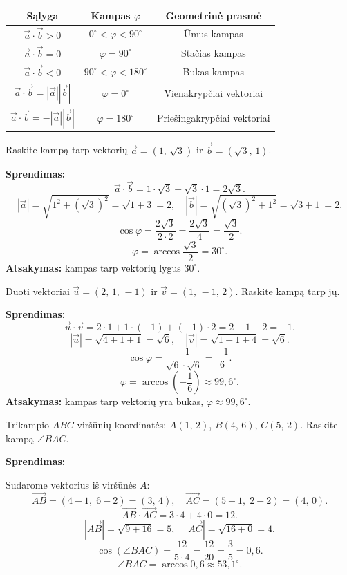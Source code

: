 \begin{center}
\begin{tabular}{|c|c|c|}
\hline
\textbf{Sąlyga} & \textbf{Kampas} $\varphi$ & \textbf{Geometrinė prasmė} \\
\hline
$\vec{a} \cdot \vec{b} > 0$ & $0^\circ < \varphi < 90^\circ$ & Ūmus kampas \\
\hline
$\vec{a} \cdot \vec{b} = 0$ & $\varphi = 90^\circ$ & Stačias kampas \\
\hline
$\vec{a} \cdot \vec{b} < 0$ & $90^\circ < \varphi < 180^\circ$ & Bukas kampas \\
\hline
$\vec{a} \cdot \vec{b} = |\vec{a}||\vec{b}|$ & $\varphi = 0^\circ$ & Vienakrypčiai vektoriai \\
\hline
$\vec{a} \cdot \vec{b} = -|\vec{a}||\vec{b}|$ & $\varphi = 180^\circ$ & Priešingakrypčiai vektoriai \\
\hline
\end{tabular}
\end{center}

\begin{example}
Raskite kampą tarp vektorių $\vec{a} = (1,\, \sqrt{3})$ ir $\vec{b} = (\sqrt{3},\, 1)$.

\textbf{Sprendimas:}
\[
\vec{a} \cdot \vec{b} = 1 \cdot \sqrt{3} + \sqrt{3} \cdot 1 = 2\sqrt{3}.
\]
\[
|\vec{a}| = \sqrt{1^2 + (\sqrt{3})^2} = \sqrt{1 + 3} = 2, \quad
|\vec{b}| = \sqrt{(\sqrt{3})^2 + 1^2} = \sqrt{3 + 1} = 2.
\]
\[
\cos\varphi = \frac{2\sqrt{3}}{2 \cdot 2} = \frac{2\sqrt{3}}{4} = \frac{\sqrt{3}}{2}.
\]
\[
\varphi = \arccos\frac{\sqrt{3}}{2} = 30^\circ.
\]
\textbf{Atsakymas:} kampas tarp vektorių lygus $30^\circ$.
\end{example}

\begin{example}
Duoti vektoriai $\vec{u} = (2,\, 1,\, -1)$ ir $\vec{v} = (1,\, -1,\, 2)$. Raskite kampą tarp jų.

\textbf{Sprendimas:}
\[
\vec{u} \cdot \vec{v} = 2 \cdot 1 + 1 \cdot (-1) + (-1) \cdot 2 = 2 - 1 - 2 = -1.
\]
\[
|\vec{u}| = \sqrt{4 + 1 + 1} = \sqrt{6}, \quad |\vec{v}| = \sqrt{1 + 1 + 4} = \sqrt{6}.
\]
\[
\cos\varphi = \frac{-1}{\sqrt{6} \cdot \sqrt{6}} = \frac{-1}{6}.
\]
\[
\varphi = \arccos\!\left(-\frac{1}{6}\right) \approx 99{,}6^\circ.
\]
\textbf{Atsakymas:} kampas tarp vektorių yra bukas, $\varphi \approx 99{,}6^\circ$.
\end{example}

\begin{example}
Trikampio $ABC$ viršūnių koordinatės: $A(1,\, 2)$, $B(4,\, 6)$, $C(5,\, 2)$. Raskite kampą $\angle BAC$.

\textbf{Sprendimas:}

Sudarome vektorius iš viršūnės $A$:
\[
\vec{AB} = (4-1,\; 6-2) = (3,\, 4), \quad \vec{AC} = (5-1,\; 2-2) = (4,\, 0).
\]
\[
\vec{AB} \cdot \vec{AC} = 3 \cdot 4 + 4 \cdot 0 = 12.
\]
\[
|\vec{AB}| = \sqrt{9 + 16} = 5, \quad |\vec{AC}| = \sqrt{16 + 0} = 4.
\]
\[
\cos(\angle BAC) = \frac{12}{5 \cdot 4} = \frac{12}{20} = \frac{3}{5} = 0{,}6.
\]
\[
\angle BAC = \arccos 0{,}6 \approx 53{,}1^\circ.
\]
\end{example}

